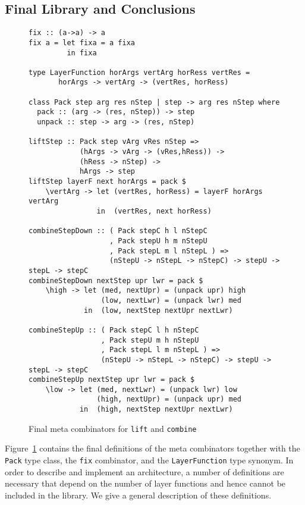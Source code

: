\subsection{Final Library and Conclusions}

\begin{figure}
\begin{small}
\begin{center}
\begin{footnotesize}
\begin{verbatim}
fix :: (a->a) -> a
fix a = let fixa = a fixa
         in fixa

type LayerFunction horArgs vertArg horRess vertRes =
       horArgs -> vertArg -> (vertRes, horRess)

class Pack step arg res nStep | step -> arg res nStep where
  pack :: (arg -> (res, nStep)) -> step
  unpack :: step -> arg -> (res, nStep)

liftStep :: Pack step vArg vRes nStep => 
            (hArgs -> vArg -> (vRes,hRess)) ->
            (hRess -> nStep) -> 
            hArgs -> step
liftStep layerF next horArgs = pack $
    \vertArg -> let (vertRes, horRess) = layerF horArgs vertArg                     
                in  (vertRes, next horRess)

combineStepDown :: ( Pack stepC h l nStepC 
                   , Pack stepU h m nStepU
                   , Pack stepL m l nStepL ) => 
                   (nStepU -> nStepL -> nStepC) -> stepU -> stepL -> stepC
combineStepDown nextStep upr lwr = pack $
    \high -> let (med, nextUpr) = (unpack upr) high
                 (low, nextLwr) = (unpack lwr) med
             in  (low, nextStep nextUpr nextLwr)

combineStepUp :: ( Pack stepC l h nStepC 
                 , Pack stepU m h nStepU
                 , Pack stepL l m nStepL ) => 
                 (nStepU -> nStepL -> nStepC) -> stepU -> stepL -> stepC
combineStepUp nextStep upr lwr = pack $
    \low -> let (med, nextLwr) = (unpack lwr) low
                (high, nextUpr) = (unpack upr) med
            in  (high, nextStep nextUpr nextLwr)
\end{verbatim}
\end{footnotesize}\caption{Final meta combinators for \texttt{lift} and
      \texttt{combine}}\label{metacombinators} 
\end{center}
\end{small}
\end{figure}

Figure~\ref{metacombinators} contains the final definitions of the meta combinators together with the \texttt{Pack} type class, the \texttt{fix} combinator, and the \texttt{LayerFunction} type synonym. In order to describe and implement an architecture, a number of definitions are necessary that depend on the number of layer functions and hence cannot be included in the library. We give a general description of these definitions.


